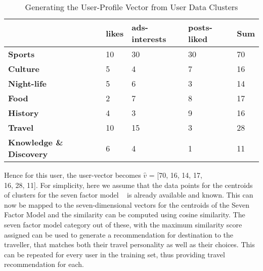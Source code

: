 \begin{table*}[t]
   
    \centering
    \small
    \begin{tabular}{|p{4cm}|p{2cm}|p{2cm}|p{2cm}|p{2cm}|}
     \hline
       & \textbf{likes} & \textbf{ads-interests} & \textbf{posts-liked} & \textbf{Sum}\\ 
     \hline
     \textbf{Sports} & 10 & 30 & 30 & 70\\ 
     \hline
     \textbf{Culture} & 5 & 4 & 7 & 16\\ 
     \hline
     \textbf{Night-life} & 5 & 6 & 3 & 14 \\ 
     \hline
     \textbf{Food} & 2 & 7 & 8 & 17\\ 
     \hline
     \textbf{History} & 4 & 3  & 9 & 16\\ 
     \hline
     \textbf{Travel} & 10 & 15 & 3 & 28\\ 
     \hline
     \textbf{Knowledge \& Discovery} & 6 & 4  & 1 & 11\\ 
     \hline
    
    \end{tabular}
     \caption{Generating the User-Profile Vector from User Data Clusters}
    \label{table: user-profile-vector}
\end{table*}




Hence for this user, the user-vector becomes 
$\hat{v}$ = [70, 16, 14, 17,\\16, 28, 11]. For simplicity, here we assume that the data points for the centroids of clusters for the seven factor model ~\cite{sertkan2018mapping} is already available and known. This can now be mapped to the seven-dimensional vectors for the centroids of the Seven Factor Model and the similarity can be computed using cosine similarity. The seven factor model category out of these, with the maximum similarity score assigned can be used to generate a recommendation for destination to the traveller, that matches both their travel personality as well as their choices.
This can be repeated for every user in the training set, thus providing travel recommendation for each.


